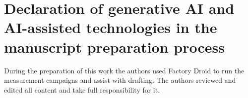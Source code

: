 \section*{Declaration of generative AI and AI-assisted technologies in the manuscript preparation process}
During the preparation of this work the authors used Factory Droid to
run the measurement campaigns and assist with drafting. The authors
reviewed and edited all content and take full responsibility for it.
